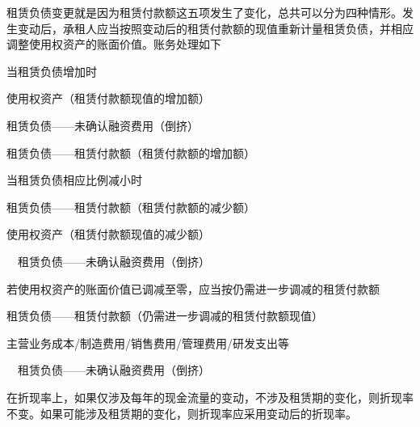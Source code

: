 \documentclass[UTF8,12pt]{ctexart}
\newenvironment{Dr}{%
	\begin{list}{}%
		{
			\setlength{\leftmargin}{2em}
			\setlength{\labelwidth}{2em}
			\setlength{\labelsep}{0pt}
			\setlength{\itemindent}{0pt}
			\setlength{\listparindent}{0pt}
			\setlength{\parsep}{0pt}
			\setlength{\topsep}{0pt}
		}
		\item[\textbf{借：}]
	}{%
	\end{list}
}
\newenvironment{Cr}{%
	\begin{list}{}%
		{
			\setlength{\leftmargin}{2em}
			\setlength{\labelwidth}{2em}
			\setlength{\labelsep}{0pt}
			\setlength{\itemindent}{0pt}
			\setlength{\listparindent}{0pt}
			\setlength{\parsep}{0pt}
			\setlength{\topsep}{0pt}
		}
		\item[\textbf{贷：}]
	}{%
	\end{list}
}
\numberwithin{equation}{section} %
\numberwithin{figure}{section}
\numberwithin{table}{section}
\begin{document}
	租赁负债变更就是因为租赁付款额这五项发生了变化，总共可以分为四种情形。发生变动后，承租人应当按照变动后的租赁付款额的现值重新计量租赁负债，并相应调整使用权资产的账面价值。账务处理如下
	
	当租赁负债增加时
	
	\begin{Dr}
		使用权资产（租赁付款额现值的增加额） 
		
		租赁负债——未确认融资费用（倒挤）
	\end{Dr}
	\begin{Cr}
		租赁负债——租赁付款额（租赁付款额的增加额）
	\end{Cr}

	当租赁负债相应比例减小时
	
	\begin{Dr}
		租赁负债——租赁付款额（租赁付款额的减少额）
	\end{Dr}
	\begin{Cr}
		使用权资产（租赁付款额现值的减少额） 
		
		\ \ 租赁负债——未确认融资费用（倒挤）
	\end{Cr}

	若使用权资产的账面价值已调减至零，应当按仍需进一步调减的租赁付款额
	
	\begin{Dr}
		租赁负债——租赁付款额（仍需进一步调减的租赁付款额现值）
	\end{Dr}
	\begin{Cr}
		主营业务成本/制造费用/销售费用/管理费用/研发支出等
		
		\ \ 租赁负债——未确认融资费用（倒挤）
	\end{Cr}
	
	在折现率上，如果仅涉及每年的现金流量的变动，不涉及租赁期的变化，则折现率不变。如果可能涉及租赁期的变化，则折现率应采用变动后的折现率。
\end{document}
